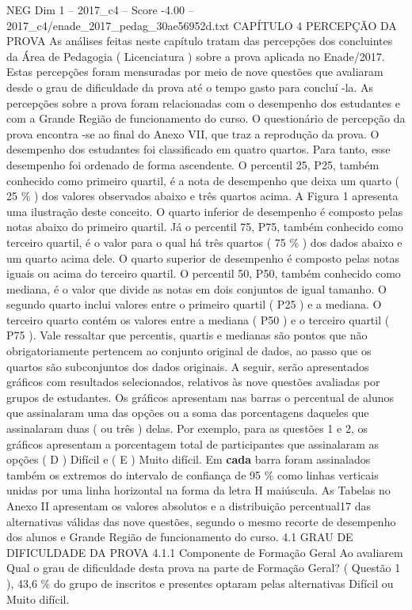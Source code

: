 \begin{textsample}{NEG Dim 1 – 2017\_c4 – Score -4.00 – 2017\_c4/enade\_2017\_pedag\_30ae56952d.txt}  \label{ex:f1_neg_169}
CAPÍTULO 4 PERCEPÇÃO DA PROVA As análises feitas neste capítulo tratam das percepções dos concluintes da Área de Pedagogia ( Licenciatura ) sobre a prova aplicada no Enade/2017.
Estas percepções foram mensuradas por meio de nove questões que avaliaram desde o grau de dificuldade da prova até o tempo gasto para concluí -la.
As percepções sobre a prova foram relacionadas com o desempenho dos estudantes e com a Grande Região de funcionamento do curso.
O questionário de percepção da prova encontra -se ao final do Anexo VII, que traz a reprodução da prova.
O desempenho dos estudantes foi classificado em quatro quartos.
Para tanto, esse desempenho foi ordenado de forma ascendente.
O percentil 25, P25, também conhecido como primeiro quartil, é a nota de desempenho que deixa um quarto ( 25 \% ) dos valores observados abaixo e três quartos acima.
A Figura 1 apresenta uma ilustração deste conceito.
O quarto inferior de desempenho é composto pelas notas abaixo do primeiro quartil.
Já o percentil 75, P75, também conhecido como terceiro quartil, é o valor para o qual há três quartos ( 75 \% ) dos dados abaixo e um quarto acima dele.
O quarto superior de desempenho é composto pelas notas iguais ou acima do terceiro quartil.
O percentil 50, P50, também conhecido como mediana, é o valor que divide as notas em dois conjuntos de igual tamanho.
O segundo quarto inclui valores entre o primeiro quartil ( P25 ) e a mediana.
O terceiro quarto contém os valores entre a mediana ( P50 ) e o terceiro quartil ( P75 ).
Vale ressaltar que percentis, quartis e medianas são pontos que não obrigatoriamente pertencem ao conjunto original de dados, ao passo que os quartos são subconjuntos dos dados originais.
A seguir, serão apresentados gráficos com resultados selecionados, relativos às nove questões avaliadas por grupos de estudantes.
Os gráficos apresentam nas barras o percentual de alunos que assinalaram uma das opções ou a soma das porcentagens daqueles que assinalaram duas ( ou três ) delas.
Por exemplo, para as questões 1 e 2, os gráficos apresentam a porcentagem total de participantes que assinalaram as opções ( D ) Difícil e ( E ) Muito difícil.
Em \textbf{cada} barra foram assinalados também os extremos do intervalo de confiança de 95 \% como linhas verticais unidas por uma linha horizontal na forma da letra H maiúscula.
As Tabelas no Anexo II apresentam os valores absolutos e a distribuição percentual17 das alternativas válidas das nove questões, segundo o mesmo recorte de desempenho dos alunos e Grande Região de funcionamento do curso. 4.1 GRAU DE DIFICULDADE DA PROVA 4.1.1 Componente de Formação Geral Ao avaliarem Qual o grau de dificuldade desta prova na parte de Formação Geral? ( Questão 1 ), 43,6 \% do grupo de inscritos e presentes optaram pelas alternativas Difícil ou Muito difícil.

\end{textsample}
